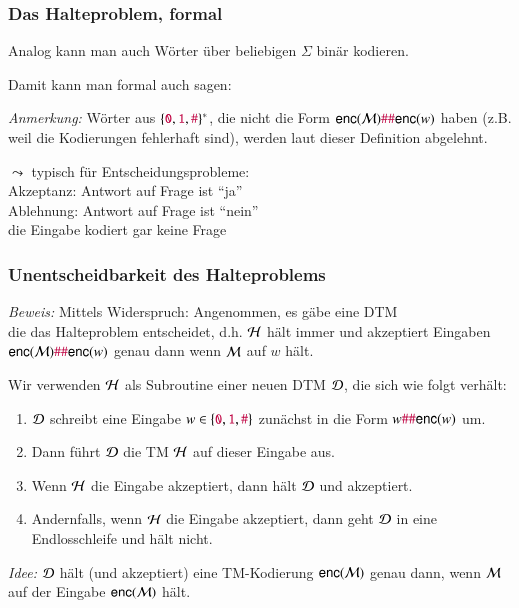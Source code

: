 \documentclass[onlymath]{beamer}
\begin{document}
\begin{frame}\frametitle{Das Halteproblem, formal}

Analog kann man auch Wörter über beliebigen $\Sigma$ binär kodieren.
\medskip

Damit kann man formal auch sagen:

\pause

\emph{Anmerkung:} Wörter aus $\{\mathtt{\textcolor{purple}{0}},\mathtt{\textcolor{purple}{1}},\mathtt{\textcolor{purple}{\#}}\}^*$, die nicht die Form
$\textsf{enc}(\mathcal{M})\mathtt{\textcolor{purple}{\#}}\mathtt{\textcolor{purple}{\#}}\textsf{enc}(w)$ haben (z.B. weil die Kodierungen fehlerhaft sind), werden
laut dieser Definition abgelehnt.\medskip

$\leadsto$ typisch für Entscheidungsprobleme:\\
\hspace{1cm}\alert{Akzeptanz:} Antwort auf Frage ist "`ja"'\\
\hspace{1cm}\alert{Ablehnung:} Antwort auf Frage ist "`nein"' \\
\hspace{2.74cm}die Eingabe kodiert gar keine Frage

\end{frame}

\begin{frame}[t]\frametitle{Unentscheidbarkeit des Halteproblems}


\emph{Beweis:} Mittels Widerspruch: Angenommen, es gäbe eine DTM \\
die das
Halteproblem entscheidet, d.h. $\mathcal{H}$ hält immer und akzeptiert Eingaben $\textsf{enc}(\mathcal{M})\mathtt{\textcolor{purple}{\#}}\mathtt{\textcolor{purple}{\#}}\textsf{enc}(w)$ genau dann wenn $\mathcal{M}$ auf $w$ hält.
\medskip\pause

Wir verwenden $\mathcal{H}$ als Subroutine einer neuen DTM $\mathcal{D}$, die sich wie folgt verhält:\pause
\begin{enumerate}[(1)]
\item $\mathcal{D}$ schreibt eine Eingabe $w\in\{\mathtt{\textcolor{purple}{0}},\mathtt{\textcolor{purple}{1}},\mathtt{\textcolor{purple}{\#}}\}$ zunächst in die Form
	$w\mathtt{\textcolor{purple}{\#}}\mathtt{\textcolor{purple}{\#}}\textsf{enc}(w)$ um.\pause
\item Dann führt $\mathcal{D}$ die TM $\mathcal{H}$ auf dieser Eingabe aus.\pause
\item Wenn $\mathcal{H}$ die Eingabe  akzeptiert, dann hält $\mathcal{D}$ und akzeptiert.\pause
\item Andernfalls, wenn $\mathcal{H}$ die Eingabe akzeptiert, dann geht $\mathcal{D}$ in eine Endlosschleife und hält nicht.\pause
\end{enumerate}
\emph{Idee:} $\mathcal{D}$ hält (und akzeptiert) eine TM-Kodierung $\textsf{enc}(\mathcal{M})$ genau dann, wenn
$\mathcal{M}$ auf der Eingabe $\textsf{enc}(\mathcal{M})$  hält.

\end{frame}
\end{document}
